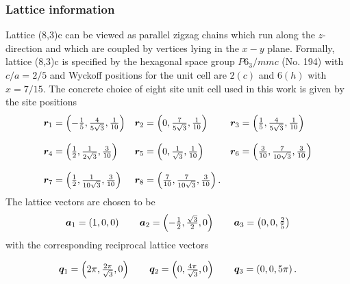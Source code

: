 \subsubsection{Lattice information}
%
%
Lattice (8,3)c can be viewed as parallel zigzag chains which run along the $z$-direction and which are coupled by vertices lying in the $x-y$ plane.
Formally, lattice (8,3)c is specified by the hexagonal space group $P6_{3}/mmc$ (No. 194) with $c/a = 2/5$ and Wyckoff positions for the unit cell are $2(c)$ and $6(h)$ with $x=7/15$.
The concrete choice of eight site unit cell used in this work is given by the site positions
%
\begin{equation}
	\begin{matrix*}[l]
		\br_1 = \left(-\frac{1}{5}, \frac{4}{5\sqrt{3}}, \frac{1}{10}\right) &
		\br_2 = \left(0, \frac{7}{5\sqrt{3}}, \frac{1}{10}\right) &
		\br_3 = \left(\frac{1}{5}, \frac{4}{5\sqrt{3}}, \frac{1}{10}\right) \\
		&\\
		\br_4 = \left(\frac{1}{2}, \frac{1}{2\sqrt{3}}, \frac{3}{10}\right) &
		\br_5 = \left(0, \frac{1}{\sqrt{3}}, \frac{1}{10}\right) &
		\br_6 = \left(\frac{3}{10}, \frac{7}{10\sqrt{3}}, \frac{3}{10}\right) \\
		&\\
		\br_7 = \left(\frac{1}{2}, \frac{1}{10\sqrt{3}}, \frac{3}{10}\right) &
		\br_8 = \left(\frac{7}{10}, \frac{7}{10\sqrt{3}}, \frac{3}{10}\right).
	\end{matrix*}
\end{equation}
%
The lattice vectors are chosen to be
%
\begin{equation}
	\begin{matrix*}[l]
		\ba_1 = \left(1, 0, 0\right) \qquad
		\ba_2 = \left(-\frac{1}{2}, \frac{\sqrt{3}}{2}, 0\right) \qquad
		\ba_3 = \left(0, 0, \frac{2}{5}\right)
	\end{matrix*}
\end{equation}
%
with the corresponding reciprocal lattice vectors
%

%
\begin{equation}
	\begin{matrix*}[l]
		\bq_1 = \left(2\pi, \frac{2\pi}{\sqrt{3}}, 0\right) \qquad
		\bq_2 = \left(0, \frac{4\pi}{\sqrt{3}}, 0\right) \qquad
		\bq_3 = \left(0, 0, 5\pi\right).
	\end{matrix*}
\end{equation}
%

